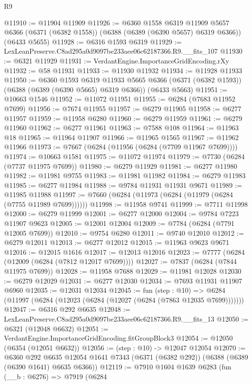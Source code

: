 \begin{lexlean}{R9}
\begin{coremodule}
@11910 := @11904 @11909
@11926 := @6360
    @1558
    @6319
    @11909
    @5657
    @6366
    (@6371 (@6382 @1558))
    (@6388 (@6389 (@6390 @5657) @6319 @6366))
    (@6433 @5655)
@11928 := @6316 @1593 @6319
@11929 := LexLeanPreserve.C8ad295a0d9097be233aee06c62187366.R9.__fits_107
@11930 := @6321 @11929
@11931 := VerdantEngine.ImportanceGridEncoding.rXy
@11932 := @58 @11931
@11933 := @11930 @11932
@11934 := @11928 @11933
@11950 := @6360
    @1593
    @6319
    @11933
    @5665
    @6366
    (@6371 (@6382 @1593))
    (@6388 (@6389 (@6390 @5665) @6319 @6366))
    (@6433 @5663)
@11951 := @10663 @1546
@11952 := @11072 @11951
@11955 := @6284 (@7683 @11952 @7699)
@11956 := @7674 @11955
@11957 := @6279 @11905
@11958 := @6277 @11957
@11959 := @11958 @6280
@11960 := @6279 @11959
@11961 := @6279 @11960
@11962 := @6277 @11961
@11963 := @7588 @108
@11964 := @11963 @18
@11965 := @11964 @11907
@11966 := @11965 @1565
@11967 := @11962 @11966
@11973 := @7667 (@6284 (@11956 (@6284 (@7709 @11967 @7699))))
@11974 := @10663 @1581
@11975 := @11072 @11974
@11979 := @7730 (@6284 (@7737 @11975 @7699))
@11980 := @6279 @11929
@11981 := @6277 @11980
@11982 := @11981 @9755
@11983 := @11981 @11982
@11984 := @6279 @11983
@11985 := @6277 @11984
@11988 := @9784 @11931 @11931 @9671
@11989 := @11985 @11988
@11997 := @7660 (@6284 (@11973 (@6284 (@11979 (@6284 (@7755 @11989 @7699))))))
@11998 := @11958 @9741
@11999 := @7711 @11998
@12000 := @6279 @11999
@12001 := @6277 @12000
@12004 := @9784 @7223 @11907 @9623
@12005 := @12001 @12004
@12009 := @7784 (@6284 (@7791 @12005 @7699))
@12010 := @9754 @6280
@12011 := @9740 @12010
@12012 := @6279 @12011
@12013 := @6277 @12012
@12015 := @11963 @9623 @9671
@12016 := @12015 @1616
@12017 := @12013 @12016
@12023 := @7777 (@6284 (@12009 (@6284 (@7812 @12017 @7699))))
@12027 := @7837 (@6284 (@7844 @11975 @7699))
@12028 := @11958 @7688
@12029 := @11981 @12028
@12030 := @6279 @12029
@12031 := @6277 @12030
@12034 := @7693 @11931 @11907 @6960
@12035 := @12031 @12034
@12045 := fun (step : @10) =>
  @6284 (@11997 (@6284 (@12023 (@6284 (@12027 (@6284 (@7863 @12035 @7699)))))))
@12047 := @6316 @292 @6635
@12048 := LexLeanPreserve.C8ad295a0d9097be233aee06c62187366.R9.__fits_13
@12050 := @6321 (@12048 @6632)
@12051 := VerdantEngine.ImportanceGridEncoding.fitGroupBlock3
@12054 := @12050 (@6354 (@12051 @6632))
@12056 := (step : @10) -> @12047 @12054
@12070 := @6360
    @292
    @6635
    @12054
    @1641
    @7343
    (@6371 (@6382 @292))
    (@6388 (@6389 (@6390 @1641) @6635 @6366))
@12119 := @7910
    @1604
    @1639
    @6283
    (fun (__b : @6276) =>
    @7919
      (@6284

\end{coremodule}
\end{lexlean}
